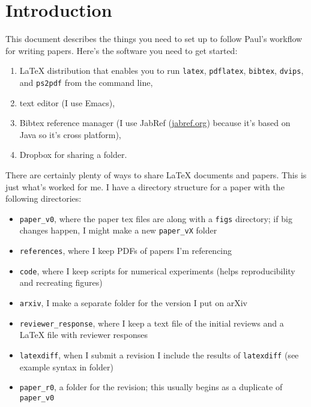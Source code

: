 \section{Introduction}
\label{sec:intro}

\noindent This document describes the things you need to set up to follow Paul's workflow for writing papers. Here's the software you need to get started:
\begin{enumerate}
\item LaTeX distribution that enables you to run \texttt{latex}, \texttt{pdflatex}, \texttt{bibtex}, \texttt{dvips}, and \texttt{ps2pdf} from the command line,
\item text editor (I use Emacs),
\item Bibtex reference manager (I use JabRef (\url{jabref.org}) because it's based on Java so it's cross platform),
\item Dropbox for sharing a folder.
\end{enumerate}
There are certainly plenty of ways to share LaTeX documents and papers. This is just what's worked for me. I have a directory structure for a paper with the following directories:
\begin{itemize}
\item \texttt{paper\_v0}, where the paper tex files are along with a \texttt{figs} directory; if big changes happen, I might make a new \texttt{paper\_vX} folder
\item \texttt{references}, where I keep PDFs of papers I'm referencing
\item \texttt{code}, where I keep scripts for numerical experiments (helps reproducibility and recreating figures)
\item \texttt{arxiv}, I make a separate folder for the version I put on arXiv
\item \texttt{reviewer\_response}, where I keep a text file of the initial reviews and a LaTeX file with reviewer responses
\item \texttt{latexdiff}, when I submit a revision I include the results of \texttt{latexdiff} (see example syntax in folder)
\item \texttt{paper\_r0}, a folder for the revision; this usually begins as a duplicate of \texttt{paper\_v0}
\end{itemize}

